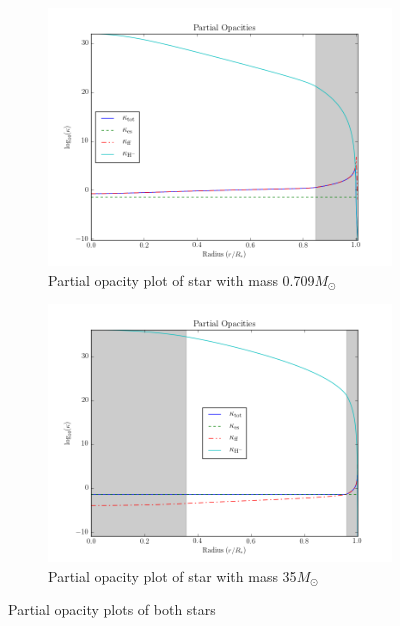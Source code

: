 \documentclass[11pt]{article}
\begin{document}
\begin{figure}[h!]
\centering
\begin{subfigure}{.5\textwidth}
  \centering
  \includegraphics[scale=0.5]{plots/star_comp-_X-0.73,Y-0.25,Z-0.02__Tc-9000000.0/partial_opacity.png}
  \caption{Partial opacity plot of star with mass 0.709$M_\odot$}
  \label{fig:posmall}
\end{subfigure}%
\begin{subfigure}{.5\textwidth}
  \centering
  \includegraphics[scale=0.5]{plots/star_comp-_X-0.73,Y-0.25,Z-0.02__Tc-33000000.0/partial_opacity.png}
  \caption{Partial opacity plot of star with mass 35$M_\odot$}
  \label{fig:pobig}
\end{subfigure}
\caption{Partial opacity plots of both stars}
\label{fig:po}
\end{figure}
\end{document}
